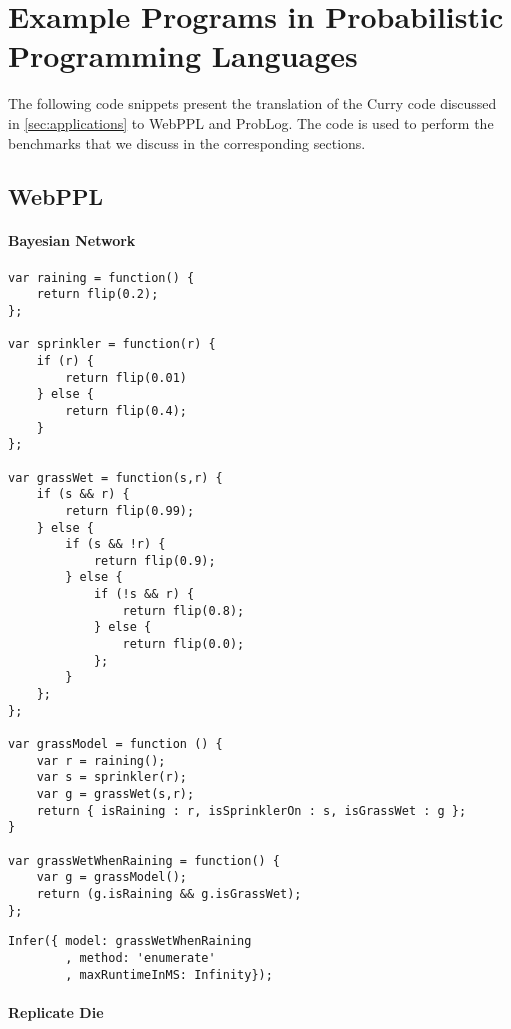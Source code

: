 \section{Example Programs in Probabilistic Programming Languages}
\label{sec:appendix:ppl}

The following code snippets present the translation of the Curry code discussed in \autoref{sec:applications} to WebPPL and ProbLog.
The code is used to perform the benchmarks that we discuss in the corresponding sections.

\subsection*{WebPPL}

\paragraph{Bayesian Network}
\begin{verbatim}
var raining = function() {
    return flip(0.2);
};

var sprinkler = function(r) {
    if (r) {
        return flip(0.01)
    } else {
        return flip(0.4);
    }
};

var grassWet = function(s,r) {
    if (s && r) {
        return flip(0.99);
    } else {
        if (s && !r) {
            return flip(0.9);
        } else {
            if (!s && r) {
                return flip(0.8);
            } else {
                return flip(0.0);
            };
        }
    };
};

var grassModel = function () {
    var r = raining();
    var s = sprinkler(r);
    var g = grassWet(s,r);
    return { isRaining : r, isSprinklerOn : s, isGrassWet : g };
}

var grassWetWhenRaining = function() {
    var g = grassModel();
    return (g.isRaining && g.isGrassWet);
};

\end{verbatim}

\begin{verbatim}
Infer({ model: grassWetWhenRaining
        , method: 'enumerate'
        , maxRuntimeInMS: Infinity});
\end{verbatim}

\paragraph{Replicate Die}

